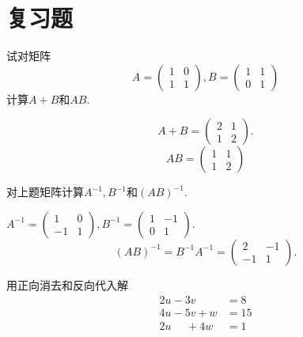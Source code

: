 ﻿\documentclass{book} \usepackage{exsheets} \usepackage{xeCJK}
\begin{document}
\section{复习题}
\begin{question}
  试对矩阵
$$
A=
\begin{pmatrix}
  1&0\\
  1&1
\end{pmatrix},B=
\begin{pmatrix}
  1&1\\
  0&1
\end{pmatrix}
$$
计算$A+B$和$AB$.
\end{question}
\begin{solution}
$$
A+B=
\begin{pmatrix}
  2&1\\
  1&2
\end{pmatrix}.
$$
$$
AB=
\begin{pmatrix}
  1&1\\
  1&2
\end{pmatrix}
$$
\end{solution}
\begin{question}
  对上题矩阵计算$A^{-1},B^{-1}$和$(AB)^{-1}$.
\end{question}
\begin{solution}
  $A^{-1}=
  \begin{pmatrix}
    1&0\\
    -1&1
  \end{pmatrix},B^{-1}=
  \begin{pmatrix}
    1&-1\\
    0&1
  \end{pmatrix}.  $
$$
(AB)^{-1}=B^{-1}A^{-1}=
\begin{pmatrix}
  2&-1\\
  -1&1
\end{pmatrix}.
$$
\end{solution}
\begin{question}
  用正向消去和反向代入解
  \begin{align*}
    2u-3v~~~~~~&=8\\
    4u-5v+w&=15\\
    2u~~~~~~+4w&=1
  \end{align*}
\end{question}
\end{document}
